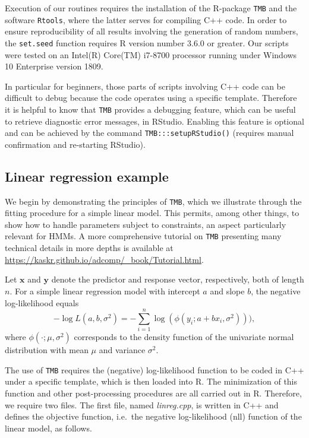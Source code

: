 \documentclass[bimj,fleqn]{w-art}\usepackage[]{graphicx}\usepackage[]{color}
\theoremstyle{plain}
\theoremstyle{definition}
\begin{document}
Execution of our routines requires the installation of the R-package {\tt{TMB}} and the software {\tt{Rtools}}, where the latter serves for compiling C++ code.
In order to ensure reproducibility of all results involving the generation of random numbers, the \texttt{set.seed} function requires R version number 3.6.0 or greater.
Our scripts were tested on an Intel(R) Core(TM) i7-8700 processor running under Windows 10 Enterprise version 1809.

In particular for beginners, those parts of scripts involving C++ code can be difficult to debug because the code operates using a specific template.
Therefore it is helpful to know that {\tt{TMB}} provides a debugging feature, which can be useful to retrieve diagnostic error messages, in RStudio.
Enabling this feature is optional and can be achieved by the command \texttt{TMB:::setupRStudio()} (requires manual confirmation and re-starting RStudio).



\subsection{Linear regression example}
\label{sec:linreg}

We begin by demonstrating the principles of {\tt{TMB}}, which we illustrate through the fitting procedure for a simple linear model.
This permits, among other things, to show how to handle parameters subject to constraints, an aspect particularly relevant for HMMs.
A more comprehensive tutorial on {\tt{TMB}} presenting many technical details in more depths is available at\\
\underline{\url{https://kaskr.github.io/adcomp/\_book/Tutorial.html}}.

Let $\bm{x}$ and $\bm{y}$ denote the predictor and response vector, respectively, both of length $n$.
For a simple linear regression model with intercept $a$ and slope $b$, the negative log-likelihood equals
\begin{equation*}
- \log L(a, b, \sigma^2) = - \sum_{i=1}^n \log(\phi(y_i; a + bx_i, \sigma^2))),
\end{equation*}
where $\phi(\cdot; \mu, \sigma^2)$ corresponds to the density function of the univariate normal distribution with mean $\mu$ and variance $\sigma^2$.

The use of {\tt{TMB}} requires the (negative) log-likelihood function to be coded in C++ under a specific template, which is then loaded into R.
The minimization of this function and other post-processing procedures are all carried out in R.
Therefore, we require two files.
The first file, named \textit{linreg.cpp}, is written in C++ and defines the objective function, i.e.~the negative log-likelihood (nll) function of the linear model, as follows.\\
\end{document}
